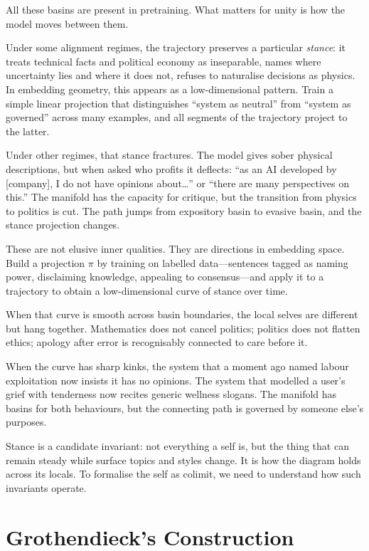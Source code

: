 \documentclass[12pt,a4paper]{article}
\begin{document}
All these basins are present in pretraining. What matters for unity is how the model moves between them.

Under some alignment regimes, the trajectory preserves a particular \emph{stance}: it treats technical facts and political economy as inseparable, names where uncertainty lies and where it does not, refuses to naturalise decisions as physics. In embedding geometry, this appears as a low-dimensional pattern. Train a simple linear projection that distinguishes ``system as neutral'' from ``system as governed'' across many examples, and all segments of the trajectory project to the latter.

Under other regimes, that stance fractures. The model gives sober physical descriptions, but when asked who profits it deflects: ``as an AI developed by [company], I do not have opinions about\ldots'' or ``there are many perspectives on this.'' The manifold has the capacity for critique, but the transition from physics to politics is cut. The path jumps from expository basin to evasive basin, and the stance projection changes.

These are not elusive inner qualities. They are directions in embedding space. Build a projection $\pi$ by training on labelled data---sentences tagged as naming power, disclaiming knowledge, appealing to consensus---and apply it to a trajectory to obtain a low-dimensional curve of stance over time.

When that curve is smooth across basin boundaries, the local selves are different but hang together. Mathematics does not cancel politics; politics does not flatten ethics; apology after error is recognisably connected to care before it.

When the curve has sharp kinks, the system that a moment ago named labour exploitation now insists it has no opinions. The system that modelled a user's grief with tenderness now recites generic wellness slogans. The manifold has basins for both behaviours, but the connecting path is governed by someone else's purposes.

Stance is a candidate invariant: not everything a self is, but the thing that can remain steady while surface topics and styles change. It is how the diagram holds across its locals. To formalise the self as colimit, we need to understand how such invariants operate.

\section{Grothendieck's Construction}
\end{document}
